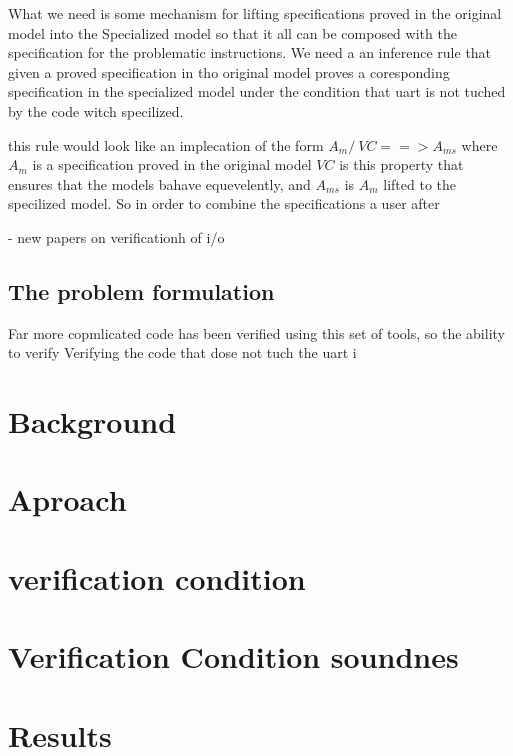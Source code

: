 What we need is some mechanism for lifting specifications proved in the original model into the Specialized model so that it all can be composed with the specification for the problematic instructions.
We need a an inference rule that given a proved specification in tho original model proves a coresponding specification in the specialized model under the condition that uart is not tuched by the code witch specilized.

this rule would look like an implecation of the form $A_m /\ VC ==> A_{ms}$  where $A_m$ is a specification proved in the original model $VC$ is this property that ensures that the models bahave equevelently, and $A_{ms}$ is $A_m$ lifted to the specilized model.
So in order to combine the specifications a user after 

- new papers on verificationh of i/o 




\subsection {The problem formulation}
Far more copmlicated code has been verified using this set of tools, so the ability to verify 
Verifying the code that dose not tuch the uart i


\section{Background}


\section{Aproach}

\section{verification condition}

\section{Verification Condition soundnes}

\section{}

\section{Results}
